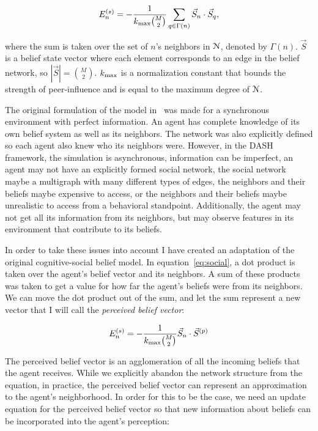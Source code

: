 \documentclass[11pt, a4paper]{article}
\begin{document}
\begin{eqnarray}\label{eq:social}
E_n^{(s)}=-\frac{1}{k_{\textup{max}}\binom{M}{2}}\sum_{q \in \Gamma(n)}^{} \vec{S}_n \cdot \vec{S}_q,
\end{eqnarray}

where the sum is taken over the set of $n$'s neighbors in $\EuScript{N}$, denoted by $\Gamma(n)$.
$\vec{S}$ is a belief state vector where each element corresponds to an edge in
the belief network, so $|\vec{S}|=\binom{M}{2}$. $k_{\textup{max}}$ is a normalization constant that bounds the
strength of peer-influence and is equal to the maximum degree of $\EuScript{N}$.


The original formulation of the model in~\cite{cogsocial} was made for a synchronous environment with perfect information. An agent has complete knowledge of its own belief system as well as its neighbors. The network was also explicitly defined so each agent also knew who its neighbors were. However, in the DASH framework, the simulation is asynchronous, information can be imperfect, an agent may not have an explicitly formed social network, the social network maybe a multigraph with many different types of edges, the neighbors and their beliefs maybe expensive to access, or the neighbors and their beliefs maybe unrealistic to access from a behavioral standpoint. Additionally, the agent may not get all its information from its neighbors, but may observe features in its environment that contribute to its beliefs.

In order to take these issues into account I have created an adaptation of the original cognitive-social belief model. In equation~\ref{eq:social}, a dot product is taken over the agent's belief vector and its neighbors. A sum of these products was taken to get a value for how far the agent's beliefs were from its neighbors. We can move the dot product out of the sum, and let the sum represent a new vector that I will call the \emph{perceived belief vector}:

\begin{eqnarray}
E_n^{(s)}=-\frac{1}{k_{\textup{max}}\binom{M}{2}} \vec{S}_n \cdot \vec{S}^{(p)}
\end{eqnarray}

The perceived belief vector is an agglomeration of all the incoming beliefs that the agent receives. While we explicitly abandon the network structure from the equation, in practice, the perceived belief vector can represent an approximation to the agent's neighborhood. In order for this to be the case, we need an update equation for the perceived belief vector so that new information about beliefs can be incorporated into the agent's perception:
\end{document}

